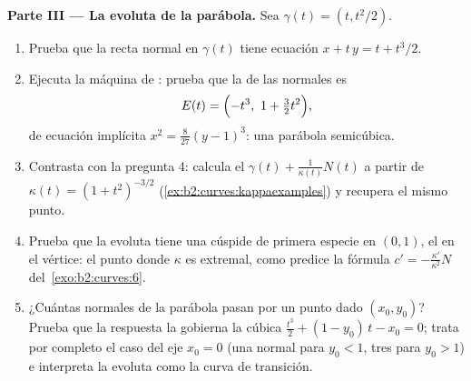\begin{problem}
\medskip
\noindent\textbf{Parte III --- La evoluta de la parábola.} Sea
$\gamma(t) = (t, t^2/2)$.
\begin{enumerate}[resume]
  \item Prueba que la recta normal en $\gamma(t)$ tiene ecuación $x
        + t\,y = t + t^3/2$.
  \item Ejecuta la máquina de : prueba que la 
        de las normales es
        \[
        E(t) = \Bigl(-t^3,\ 1 + \tfrac32 t^2\Bigr),
        \]
        de ecuación implícita $x^2 = \tfrac8{27}(y - 1)^3$: una
        parábola semicúbica.
  \item Contrasta con la pregunta 4: calcula el 
        $\gamma(t) + \frac1{\kappa(t)}N(t)$ a partir de $\kappa(t) =
        (1 + t^2)^{-3/2}$ (\cref{ex:b2:curves:kappaexamples}) y
        recupera el mismo punto.
  \item Prueba que la evoluta tiene una cúspide de primera especie
        en $(0, 1)$, el  en el vértice: el punto
        donde $\kappa$ es extremal, como predice la fórmula $c' =
        -\frac{\kappa'}{\kappa^2}N$ del~\cref{exo:b2:curves:6}.
  \item ¿Cuántas normales de la parábola pasan por un punto dado
        $(x_0, y_0)$? Prueba que la respuesta la gobierna la cúbica
        $\tfrac{t^3}2 + (1 - y_0)\,t - x_0 = 0$; trata por completo
        el caso del eje $x_0 = 0$ (una normal para $y_0 < 1$, tres
        para $y_0 > 1$) e interpreta la evoluta como la curva de
        transición.
\end{enumerate}


\end{problem}
